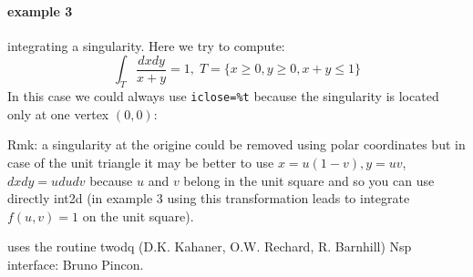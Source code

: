 \begin{examples}
\paragraph{example 3} integrating a singularity. Here we try to compute:
$$
    \int_T \frac{dxdy}{x+y} = 1, \; T = \{ x \ge 0, y \ge 0, x+y \le 1 \}
$$ 
In this case we could always use \verb+iclose=%t+ because the singularity is
located only at one vertex $(0,0)$:
\begin{program}
\end{program}
Rmk: a singularity at the origine could be removed using polar
coordinates but in case of the unit triangle it may be better
to use $x = u(1-v), y = uv$, $dxdy = u dudv$ because $u$ and $v$
belong in the unit square and so you can use directly int2d
(in example 3 using this transformation leads to integrate $f(u,v)=1$
on the unit square). 
\end{examples}

\begin{manseealso}
\end{manseealso}

\begin{authors}
  uses the routine twodq (D.K. Kahaner, O.W. Rechard, R. Barnhill)
  Nsp interface: Bruno Pincon.
\end{authors}
